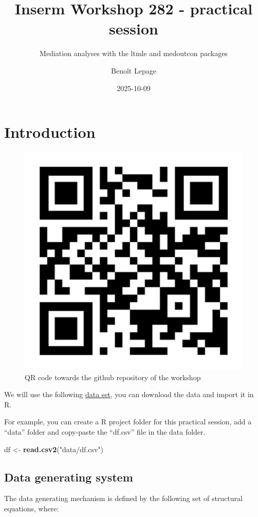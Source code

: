 \documentclass[
]{book}
\title{Inserm Workshop 282 - practical session}
\subtitle{Mediation analyses with the ltmle and medoutcon packages}
\author{Benoît Lepage}
\date{2025-10-09}
\newenvironment{Shaded}{\begin{snugshade}}{\end{snugshade}}
\newcommand{\FunctionTok}[1]{\textcolor[rgb]{0.13,0.29,0.53}{\textbf{#1}}}
\newcommand{\NormalTok}[1]{#1}
\newcommand{\OtherTok}[1]{\textcolor[rgb]{0.56,0.35,0.01}{#1}}
\newcommand{\StringTok}[1]{\textcolor[rgb]{0.31,0.60,0.02}{#1}}
\begin{document}
\maketitle

{
\setcounter{tocdepth}{1}
\tableofcontents
}
\chapter{Introduction}\label{introduction}

\begin{figure}

{\centering \includegraphics[width=0.3\linewidth]{./images/url} 

}

\caption{QR code towards the github repository of the workshop}\label{fig:qrcode}
\end{figure}

We will use the following \href{https://github.com/benoitlepage/Inserm_workshop_282/blob/main/data/df.csv}{data set}, you can download the data and import it in R.

For example, you can create a R project folder for this practical session, add a ``data'' folder and copy-paste the ``df.csv'' file in the data folder.

\begin{Shaded}
\begin{Highlighting}[]
\NormalTok{df }\OtherTok{\textless{}{-}} \FunctionTok{read.csv2}\NormalTok{(}\StringTok{"data/df.csv"}\NormalTok{)}
\end{Highlighting}
\end{Shaded}

\section{Data generating system}\label{data-generating-system}

The data generating mechanism is defined by the following set of structural equations, where:
\end{document}
